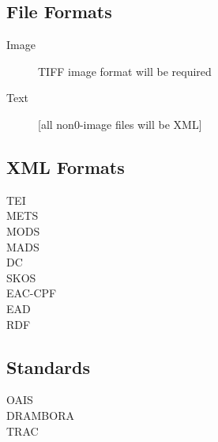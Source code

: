 \subsection{File Formats}

\begin{description}
  \item[Image]{TIFF image format will be required}
  \item[Text][all non0-image files will be XML]
\end{description}

\subsection{XML Formats}
\begin{description}
  \item[TEI]{}
  \item[METS]{}
  \item[MODS]{}
  \item[MADS]{}
  \item[DC]{}
  \item[SKOS]{}
  \item[EAC-CPF]{}
  \item[EAD]{}
  \item[RDF]{}
\end{description}

\subsection{Standards}
\begin{description}
  \item[OAIS]{}
  \item[DRAMBORA]{}
  \item[TRAC]{}
\end{description}

